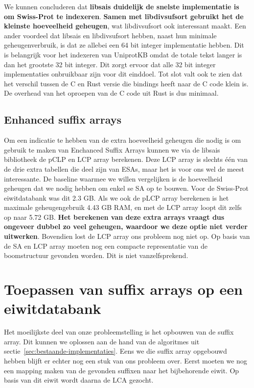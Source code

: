 We kunnen concluderen dat \textbf{libsais duidelijk de snelste implementatie is om Swiss-Prot te indexeren}.
\textbf{Samen met libdivsufsort gebruikt het de kleinste hoeveelheid geheugen}, wat libdivsufsort ook interessant maakt.
Een ander voordeel dat libsais en libdivsufsort hebben, naast hun minimale geheugenverbruik, is dat ze allebei een 64 bit integer implementatie hebben.
Dit is belangrijk voor het indexeren van UniprotKB omdat de totale tekst langer is dan het grootste 32 bit integer.
Dit zorgt ervoor dat alle 32 bit integer implementaties onbruikbaar zijn voor dit einddoel.
Tot slot valt ook te zien dat het verschil tussen de C en Rust versie die bindings heeft naar de C code klein is.
De overhead van het oproepen van de C code uit Rust is dus minimaal.

\subsection{Enhanced suffix arrays}\label{subsec:enhanced-suffix-arrays}
Om een indicatie te hebben van de extra hoeveelheid geheugen die nodig is om gebruik te maken van Enchanced Suffix Arrays kunnen we via de libsais bibliotheek de pCLP en LCP array berekenen.
Deze LCP array is slechts één van de drie extra tabellen die deel zijn van ESAs, maar het is voor ons wel de meest interessante.
De baseline waarmee we willen vergelijken is de hoeveelheid geheugen dat we nodig hebben om enkel se SA op te bouwen.
Voor de Swiss-Prot eiwitdatabank was dit 2.3 GB\@.
Als we ook de pLCP array berekenen is het maximale geheugengebruik 4.43 GB RAM, en met de LCP array loopt dit zelfs op naar 5.72 GB\@.
\textbf{Het berekenen van deze extra arrays vraagt dus ongeveer dubbel zo veel geheugen, waardoor we deze optie niet verder uitwerken}.
Bovendien lost de LCP array ons probleem nog niet op.
Op basis van de SA en LCP array moeten nog een compacte representatie van de boomstructuur gevonden worden.
Dit is niet vanzelfsprekend.

\section{Toepassen van suffix arrays op een eiwitdatabank}\label{sec:toepassen-van-suffix-arrays-op-een-eiwitdatabank}
Het moeilijkste deel van onze probleemstelling is het opbouwen van de suffix array.
Dit kunnen we oplossen aan de hand van de algoritmes uit sectie~\ref{sec:bestaande-implementaties}.
Eens we die suffix array opgebouwd hebben blijft er echter nog een stuk van ons probleem over.
Eerst moeten we nog een mapping maken van de gevonden suffixen naar het bijbehorende eiwit.
Op basis van dit eiwit wordt daarna de LCA gezocht.

